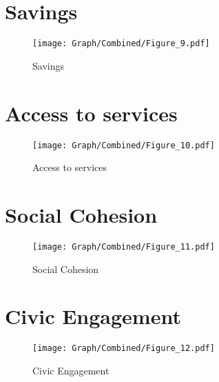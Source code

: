 \documentclass[10pt,a4paper]{article}
\begin{document}
\section{Savings}
\begin{table}[H]\centering

\end{table}
\begin{figure}[H]\centering
\texttt{[image: Graph/Combined/Figure\_9.pdf]}
\caption{Savings} \label{fig:Fig_9}
\end{figure}
\begin{table}[H]\centering

\end{table}
\pagebreak
\section{Access to services}
\begin{table}[H]\centering

\end{table}
\begin{figure}[H]\centering
\texttt{[image: Graph/Combined/Figure\_10.pdf]}
\caption{Access to services} \label{fig:Fig_10}
\end{figure}
\begin{table}[H]\centering

\end{table}
\pagebreak
\section{Social Cohesion}
\begin{table}[H]\centering

\end{table}
\begin{figure}[H]\centering
\texttt{[image: Graph/Combined/Figure\_11.pdf]}
\caption{Social Cohesion} \label{fig:Fig_11}
\end{figure}
\begin{table}[H]\centering

\end{table}
\pagebreak
\section{Civic Engagement}
\begin{table}[H]\centering

\end{table}
\begin{figure}[H]\centering
\texttt{[image: Graph/Combined/Figure\_12.pdf]}
\caption{Civic Engagement} \label{fig:Fig_12}
\end{figure}
\begin{table}[H]\centering

\end{table}
\pagebreak
\end{document}

